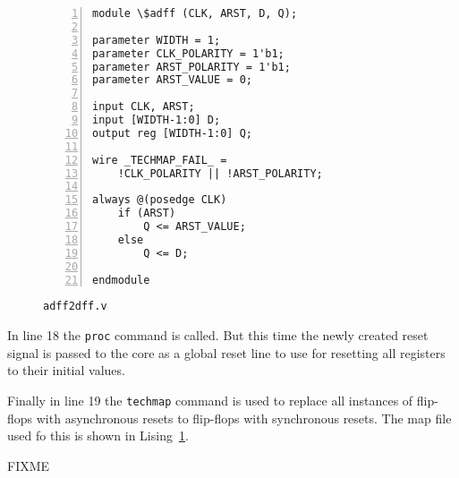 \begin{figure}[b!]
\begin{lstlisting}[frame=trBL,xleftmargin=1.5em,numbers=left]
module \$adff (CLK, ARST, D, Q);

parameter WIDTH = 1;
parameter CLK_POLARITY = 1'b1;
parameter ARST_POLARITY = 1'b1;
parameter ARST_VALUE = 0;

input CLK, ARST;
input [WIDTH-1:0] D;
output reg [WIDTH-1:0] Q;

wire _TECHMAP_FAIL_ =
    !CLK_POLARITY || !ARST_POLARITY;

always @(posedge CLK)
	if (ARST)
		Q <= ARST_VALUE;
	else
		Q <= D;

endmodule
\end{lstlisting}
 \renewcommand{\figurename}{Listing}
\caption{\tt adff2dff.v}
\label{adff2dff.v}
\end{figure}

In line 18 the {\tt proc} command is called. But this time the newly created
reset signal is passed to the core as a global reset line to use for resetting
all registers to their initial values.

Finally in line 19 the {\tt techmap} command is used to replace all instances
of flip-flops with asynchronous resets to flip-flops with synchronous resets.
The map file used fo this is shown in Lising~\ref{adff2dff.v}.

{\color{red} FIXME}

